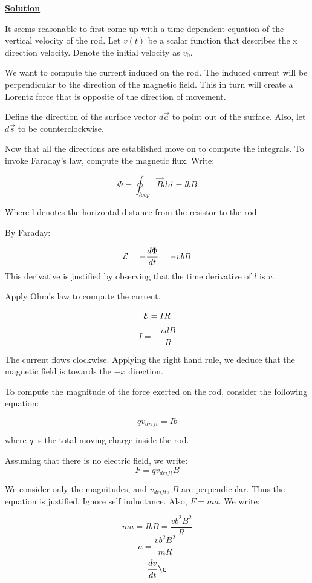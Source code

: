 \documentclass{article}
\newcommand{\new}[1]{
    \vspace{2mm}
    \noindent
    \textbf{
    \underline{#1}}
}
\begin{document}
\new{Solution}
It seems reasonable to first come up 
with a time dependent equation of
the vertical velocity of the rod. Let 
$v(t)$ be a scalar function that describes 
the x direction velocity. Denote the initial 
velocity as $v_0$. 

We want to compute the current induced 
on the rod. The induced current 
will be perpendicular to the direction of 
the magnetic field. This in turn will 
create a Lorentz force that is opposite 
of the direction of movement. 

Define the direction of the surface vector 
$d\vec{a}$ to point out of the surface. 
Also, let $d\vec{s}$ to be counterclockwise. 

Now that all the directions are established 
move on to compute the integrals. To 
invoke Faraday's law, compute the magnetic 
flux. Write:

\[
    \Phi = \oint_{loop} \vec{B}d\vec{a}
     = lbB
\]

Where l denotes the horizontal distance 
from the resistor to the rod. 

By Faraday:

\[
    {\mathcal{E}} = 
    -\frac{d\Phi}{dt}
     = -vbB
\]
This derivative is justified by observing 
that the time derivative of $l$ is $v$. 

Apply Ohm's law to compute the current. 

\[
    {\mathcal{E}} = I R
\]
\[
    I = -\frac{vdB}{R}
\]

The current flows clockwise. 
Applying the right hand rule, 
we deduce that the magnetic field 
is towards the $-x$ direction. 

To compute the magnitude of the 
force exerted on the rod, consider
the following equation:

\[
    qv_{drift} = Ib
\]

where $q$ is the total moving charge 
inside the rod. 

Assuming that there is no electric field, 
we write:
\[
    F = qv_{drift}B
\]

We consider only the magnitudes, and 
$v_{drift}$, $B$ are perpendicular. Thus 
the equation is justified. Ignore self 
inductance. Also, $F = ma$. We write:

\[
    ma = IbB = \frac{vb^2B^2}{R}
\]
\[
    a = \frac{vb^2B^2}{mR}
\]
\[
    \frac{dv}{dt}\c
\]
\end{document}
